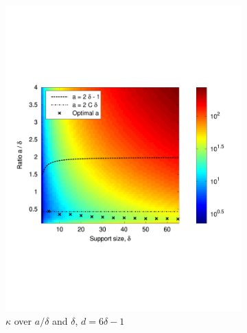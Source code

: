   \begin{figure}[hbt]
    \centering
    \begin{subfigure}[b]{.49\textwidth}
      \centering
      \includegraphics[width=\textwidth,trim={.4in 2.5in .8in 2.5in}]{figs/flattable}
      \caption{$\kappa$ over $a / \delta$ and $\delta$, $d = 6 \delta - 1$}
      \label{fig:flattable}
    \end{subfigure}
    \begin{subfigure}[b]{.49\textwidth}
      \centering

\end{subfigure}
\end{figure}
